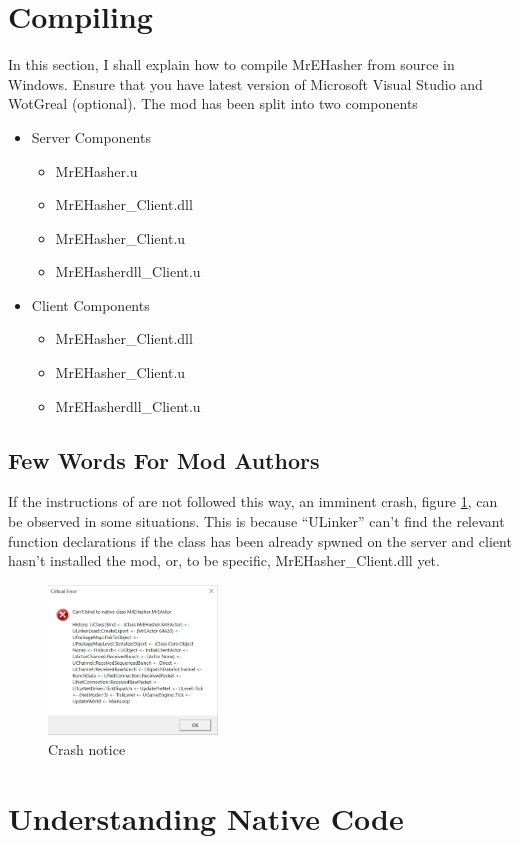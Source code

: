 \documentclass{article}
\theoremstyle{definition}
\newcommand{\FileColor}[1]{{\color{Purple} #1}}
\begin{document}
\section{Compiling}
In this section, I shall explain how to compile MrEHasher from source in Windows.  Ensure that you have latest version of Microsoft Visual Studio and WotGreal (optional). The mod has 
been split into two components

\begin{itemize}
\item Server Components
\begin{itemize}
\item \FileColor{MrEHasher.u}
\item \FileColor{MrEHasher\_Client.dll}
\item \FileColor{MrEHasher\_Client.u}
\item \FileColor{MrEHasherdll\_Client.u}
\end{itemize}
\item Client Components
\begin{itemize}
\item \FileColor{MrEHasher\_Client.dll}
\item \FileColor{MrEHasher\_Client.u}
\item \FileColor{MrEHasherdll\_Client.u}
\end{itemize}
\end{itemize}

\subsection{Few Words For Mod Authors}
If the instructions of are not followed this way, an imminent crash, figure \ref{fig:nativebindcrash}, can be observed in some situations.  This is because ``ULinker'' can't find the relevant function declarations if the class has been already spwned on the server and client hasn't installed the mod, or, to be specific, \FileColor{MrEHasher\_Client.dll} yet.

\begin{figure}
\centering
\includegraphics[width=0.4\textwidth]{img_nativebindcrash}
\caption{Crash notice}
\label{fig:nativebindcrash}
\end{figure}



\section{Understanding Native Code}
\end{document}
